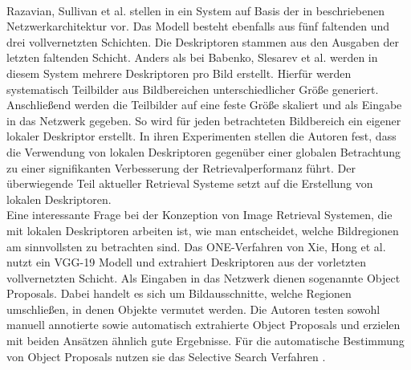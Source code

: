 \\
Razavian, Sullivan et al. stellen in \cite{convnet} ein System auf Basis der in \cite{convnetarc} beschriebenen Netzwerkarchitektur vor. Das Modell besteht ebenfalls aus fünf faltenden und drei vollvernetzten Schichten. Die Deskriptoren stammen aus den Ausgaben der letzten faltenden Schicht.
Anders als bei Babenko, Slesarev et al. werden in diesem System mehrere Deskriptoren pro Bild erstellt. Hierfür werden systematisch Teilbilder aus Bildbereichen unterschiedlicher Größe generiert. Anschließend werden die Teilbilder auf eine feste Größe skaliert und als Eingabe in das Netzwerk gegeben. So wird für jeden betrachteten Bildbereich ein eigener lokaler Deskriptor erstellt. In ihren Experimenten stellen die Autoren fest, dass die Verwendung von lokalen Deskriptoren gegenüber einer globalen Betrachtung zu einer signifikanten Verbesserung der Retrievalperformanz führt. Der überwiegende Teil aktueller Retrieval Systeme setzt auf die Erstellung von lokalen Deskriptoren.
\\
Eine interessante Frage bei der Konzeption von Image Retrieval Systemen, die mit lokalen Deskriptoren arbeiten ist, wie man entscheidet, welche Bildregionen am sinnvollsten zu betrachten sind. Das ONE-Verfahren \cite{one} von Xie, Hong et al. nutzt ein VGG-19 \cite{vgg} Modell und extrahiert Deskriptoren aus der vorletzten vollvernetzten Schicht. Als Eingaben in das Netzwerk dienen sogenannte Object Proposals. Dabei handelt es sich um Bildausschnitte, welche Regionen umschließen, in denen Objekte vermutet werden. Die Autoren testen sowohl manuell annotierte sowie automatisch extrahierte Object Proposals und erzielen mit beiden Ansätzen ähnlich gute Ergebnisse. Für die automatische Bestimmung von Object Proposals nutzen sie das Selective Search Verfahren \cite{selective_search}.
\\
